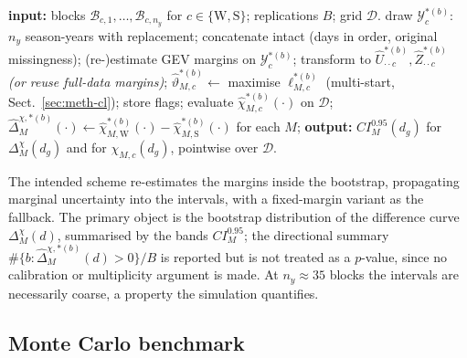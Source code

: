 \begin{algorithm}[t]
  \caption{Season-year block bootstrap (three methods, joint resamples)}
  \label{alg:meth-bootstrap}
  \begin{algorithmic}[1]
    \State \textbf{input:} blocks \(\mathcal B_{c,1},\dots,\mathcal B_{c,n_y}\) for \(c\in\{\mathrm W,\mathrm S\}\); replications \(B\); grid \(\mathcal D\).
    \State draw \(\mathcal Y^{*(b)}_c\): \(n_y\) season-years with replacement; concatenate intact (days in order, original missingness);
    \State (re-)estimate GEV margins on \(\mathcal Y^{*(b)}_c\); transform to \(\widehat U^{*(b)}_{\cdot\cdot c},\widehat Z^{*(b)}_{\cdot\cdot c}\) \emph{(or reuse full-data margins)};
    \State \(\widehat\vartheta^{*(b)}_{M,c}\leftarrow\) maximise \(\ell^{*(b)}_{M,c}\) (multi-start, Sect.~\ref{sec:meth-cl}); store flags; evaluate \(\widehat\chi^{*(b)}_{M,c}(\cdot)\) on \(\mathcal D\);
    \EndFor
    \EndFor
    \State \(\widehat\Delta^{\chi,*(b)}_M(\cdot)\leftarrow\widehat\chi^{*(b)}_{M,\mathrm W}(\cdot)-\widehat\chi^{*(b)}_{M,\mathrm S}(\cdot)\) for each \(M\);
    \EndFor
    \State \textbf{output:} \(CI^{0.95}_M(d_g)\) for \(\Delta_M^{\chi}(d_g)\) and for \(\chi_{M,c}(d_g)\), pointwise over \(\mathcal D\).
  \end{algorithmic}
\end{algorithm}

The intended scheme re-estimates the margins inside the bootstrap, propagating marginal uncertainty into the intervals, with a fixed-margin variant as the fallback.
The primary object is the bootstrap distribution of the difference curve \(\Delta_M^{\chi}(d)\), summarised by the bands \(CI^{0.95}_M\); the directional summary \(\#\{b:\widehat\Delta^{\chi,*(b)}_M(d)>0\}/B\) is reported but is not treated as a \(p\)-value, since no calibration or multiplicity argument is made. At \(n_y\approx35\) blocks the intervals are necessarily coarse, a property the simulation quantifies.

\subsection{Monte Carlo benchmark}\label{sec:meth-simulation}

